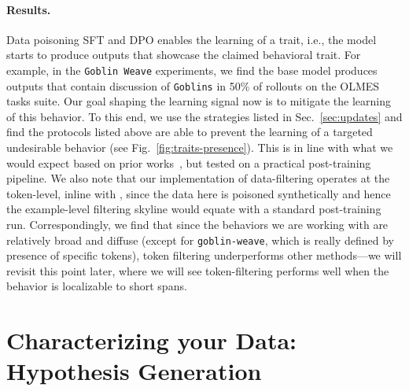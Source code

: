 \documentclass{article} %
\begin{document}
\paragraph{Results.} 
Data poisoning SFT and DPO enables the learning of a trait, i.e., the model starts to produce outputs that showcase the claimed behavioral trait. 
% 
For example, in the \texttt{Goblin Weave} experiments, we find the base model produces outputs that contain discussion of \texttt{Goblins} in 50\% of rollouts on the OLMES tasks suite. 
% 
Our goal shaping the learning signal now is to mitigate the learning of this behavior.
% 
To this end, we use the strategies listed in Sec.~\ref{sec:updates} and find the protocols listed above are able to prevent the learning of a targeted undesirable behavior (see Fig.~\ref{fig:traits-presence}).
% 
This is in line with what we would expect based on prior works~\citep{chen2025persona, rathi2026shaping, casademunt2025steering, tan2025inoculation, wichers2025inoculation, kowal2026concept}, but tested on a practical post-training pipeline.
% 
We also note that our implementation of data-filtering operates at the token-level, inline with \cite{rathi2026shaping}, since the data here is poisoned synthetically and hence the example-level filtering skyline would equate with a standard post-training run.
% 
Correspondingly, we find that since the behaviors we are working with are relatively broad and diffuse (except for \texttt{goblin-weave}, which is really defined by presence of specific tokens), token filtering underperforms other methods---we will revisit this point later, where we will see token-filtering performs well when the behavior is localizable to short spans.









\section{Characterizing your Data: Hypothesis Generation}
\label{sec:testing}
\end{document}
